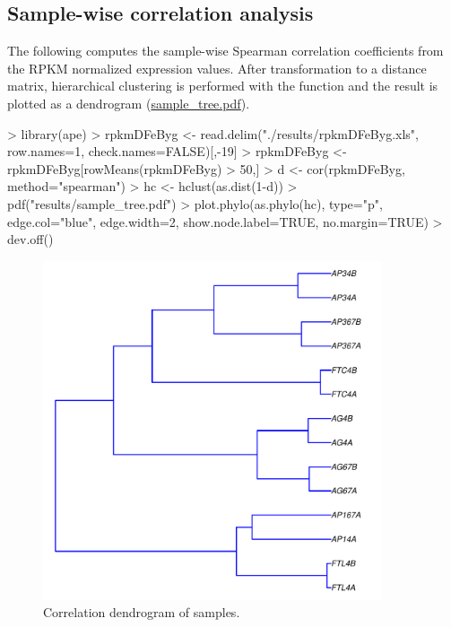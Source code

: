 \documentclass{article}
\begin{document}
\subsection{Sample-wise correlation analysis}
The following computes the sample-wise Spearman correlation coefficients from the RPKM normalized expression values. After transformation to a distance matrix, hierarchical clustering is performed with the  function and the result is plotted as a dendrogram (\href{run:./results/sample_tree.pdf}{sample\_tree.pdf}). 
\begin{Schunk}
\begin{Sinput}
> library(ape)
> rpkmDFeByg <- read.delim("./results/rpkmDFeByg.xls", row.names=1, check.names=FALSE)[,-19]
> rpkmDFeByg <- rpkmDFeByg[rowMeans(rpkmDFeByg) > 50,]
> d <- cor(rpkmDFeByg, method="spearman")
> hc <- hclust(as.dist(1-d))
> pdf("results/sample_tree.pdf")
> plot.phylo(as.phylo(hc), type="p", edge.col="blue", edge.width=2, show.node.label=TRUE, no.margin=TRUE)
> dev.off()
\end{Sinput}
\end{Schunk}
\begin{figure}[H]
  \centering
   \includegraphics[width=10cm]{sample_tree.pdf}
   \caption{Correlation dendrogram of samples.}
   \label{fig:sample_tree}
\end{figure}
\end{document}

